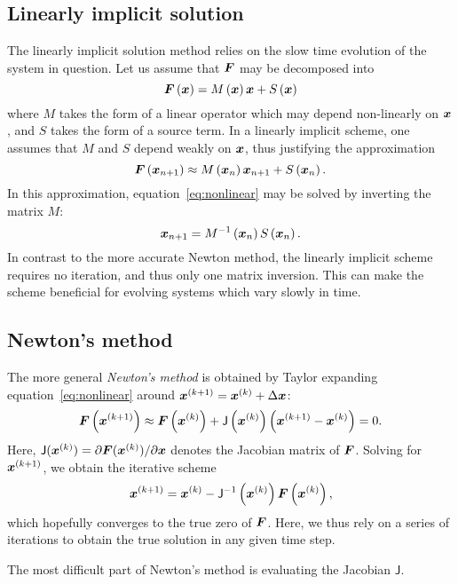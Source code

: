 \documentclass{notes}
\newcommand{\Jac}{\mathsf{J}}
\begin{document}
    \subsection{Linearly implicit solution}
    The linearly implicit solution method relies on the slow time evolution of
    the system in question. Let us assume that $\boldsymbol{F}$ may be decomposed into
    \begin{equation}
        \boldsymbol{F}\left( \boldsymbol{x} \right) = M\left( \boldsymbol{x} \right) \boldsymbol{x} + S\left( \boldsymbol{x} \right)
    \end{equation}
    where $M$ takes the form of a linear operator which may depend non-linearly
    on $\boldsymbol{x}$, and $S$ takes the form of a source term. In a linearly implicit
    scheme, one assumes that $M$ and $S$ depend weakly on $\boldsymbol{x}$, thus
    justifying the approximation
    \begin{equation}
        \boldsymbol{F}\left( \boldsymbol{x}_{n+1} \right)\approx M\left( \boldsymbol{x}_n\right) \boldsymbol{x}_{n+1}
        + S\left( \boldsymbol{x}_n \right).
    \end{equation}
    In this approximation, equation~\eqref{eq:nonlinear} may be solved by
    inverting the matrix $M$:
    \begin{equation}
        \boldsymbol{x}_{n+1} = M^{-1}\left(\boldsymbol{x}_n\right) S\left(\boldsymbol{x}_n\right).
    \end{equation}
    In contrast to the more accurate Newton method, the linearly implicit scheme
    requires no iteration, and thus only one matrix inversion. This can make the
    scheme beneficial for evolving systems which vary slowly in time.
    
    \subsection{Newton's method}
    The more general \emph{Newton's method} is obtained by Taylor expanding
    equation~\eqref{eq:nonlinear} around $\boldsymbol{x}^{(k+1)} = \boldsymbol{x}^{(k)} + \Delta\boldsymbol{x}$:
    \begin{equation}
        \bb{F}\left( \bb{x}^{(k+1)} \right)\approx \bb{F}\left(\bb{x}^{(k)}\right) +
        \Jac\left(\bb{x}^{(k)}\right) \left( \bb{x}^{(k+1)} - \bb{x}^{(k)} \right) = 0.
    \end{equation}
    Here, $\Jac(\bb{x}^{(k)}) = \partial\bb{F}(\bb{x}^{(k)})/\partial\bb{x}$
    denotes the Jacobian matrix of $\boldsymbol{F}$. Solving for $\boldsymbol{x}^{(k+1)}$, we
    obtain the iterative scheme
    \begin{equation}
        \bb{x}^{(k+1)} = \bb{x}^{(k)} - \Jac^{-1}\left( \bb{x}^{(k)} \right) \bb{F}\left( \bb{x}^{(k)} \right),
    \end{equation}
    which hopefully converges to the true zero of $\boldsymbol{F}$. Here, we thus rely
    on a series of iterations to obtain the true solution in any given time
    step.

    The most difficult part of Newton's method is evaluating the Jacobian
    $\Jac$.

    \printbibliography
\end{document}

